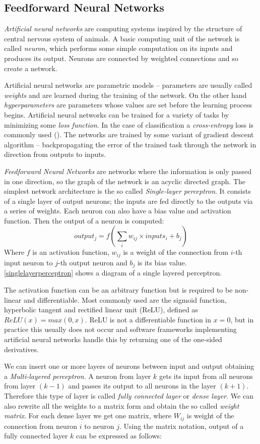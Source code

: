 \subsection{Feedforward Neural Networks}
\textit{Artificial neural networks} are computing systems inspired by the structure of central nervous system of animals. A basic computing unit of the network is called \textit{neuron}, which performs some simple computation on its inputs and produces its output. Neurons are connected by weighted connections and so create a network. \par
Artificial neural networks are parametric models -- parameters are usually called \textit{weights} and are learned during the training of the network. On the other hand \textit{hyperparameters} are parameters whose values are set before the learning process begins. Artificial neural networks can be trained for a variety of tasks by minimizing some \textit{loss function}. In the case of classification a \textit{cross-entropy} loss is commonly used (\cite{goodfellow_deep_2016}). The networks are trained by some variant of gradient descent algorithm -- backpropagating the error of the trained task through the network in direction from outputs to inputs. \par
\textit{Feedforward Neural Networks} are networks where the information is only passed in one direction, so the graph of the network is an acyclic directed graph. The simplest network architecture is the so called \textit{Single-layer perceptron}. It consists of a single layer of output neurons; the inputs are fed directly to the outputs via a series of weights. Each neuron can also have a bias value and activation function. Then the output of a neuron is computed: $$output_j = f(\sum_{i} {w_{ij}\times inputs_i + b_j})$$ Where $f$ is an activation function, $w_{ij}$ is a weight of the connection from $i$-th input neuron to $j$-th output neuron and $b_j$ is its bias value. \autoref{singlelayerperceptron} shows a diagram of a single layered perceptron.

The activation function can be an arbitrary function but is required to be non-linear and differentiable. Most commonly used are the sigmoid function, hyperbolic tangent and rectified linear unit (ReLU), defined as $ReLU(x) = max(0,x)$. ReLU is not a differentiable function in $x=0$, but in practice this usually does not occur and software frameworks implementing artificial neural networks handle this by returning one of the one-sided derivatives.\par  
We can insert one or more layers of neurons between input and output obtaining a \textit{Multi-layered perceptron}. A neuron from layer $k$ gets its input from all neurons from layer $(k-1)$ and passes its output to all neurons in the layer $(k+1)$. Therefore this type of layer is called \textit{fully connected layer} or \textit{dense layer}.  We can also rewrite all the weights to a matrix form and obtain the so called \textit{weight matrix}. For each dense layer we get one matrix, where $W_{ij}$ is weight of the connection from neuron $i$ to neuron $j$. Using the matrix notation, output of a fully connected layer $k$ can be expressed as follows: 
